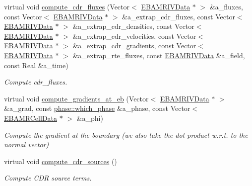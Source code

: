 \begin{DoxyCompactItemize}
virtual void \hyperlink{classtime__stepper_a860500ae7f8fb3042a5482469155a5f8}{compute\+\_\+cdr\+\_\+fluxes} (Vector$<$ \hyperlink{type__definitions_8H_a6b8fa905d55cbb491b52180386f0e0c1}{E\+B\+A\+M\+R\+I\+V\+Data} $\ast$ $>$ \&a\+\_\+fluxes, const Vector$<$ \hyperlink{type__definitions_8H_a6b8fa905d55cbb491b52180386f0e0c1}{E\+B\+A\+M\+R\+I\+V\+Data} $\ast$ $>$ \&a\+\_\+extrap\+\_\+cdr\+\_\+fluxes, const Vector$<$ \hyperlink{type__definitions_8H_a6b8fa905d55cbb491b52180386f0e0c1}{E\+B\+A\+M\+R\+I\+V\+Data} $\ast$ $>$ \&a\+\_\+extrap\+\_\+cdr\+\_\+densities, const Vector$<$ \hyperlink{type__definitions_8H_a6b8fa905d55cbb491b52180386f0e0c1}{E\+B\+A\+M\+R\+I\+V\+Data} $\ast$ $>$ \&a\+\_\+extrap\+\_\+cdr\+\_\+velocities, const Vector$<$ \hyperlink{type__definitions_8H_a6b8fa905d55cbb491b52180386f0e0c1}{E\+B\+A\+M\+R\+I\+V\+Data} $\ast$ $>$ \&a\+\_\+extrap\+\_\+cdr\+\_\+gradients, const Vector$<$ \hyperlink{type__definitions_8H_a6b8fa905d55cbb491b52180386f0e0c1}{E\+B\+A\+M\+R\+I\+V\+Data} $\ast$ $>$ \&a\+\_\+extrap\+\_\+rte\+\_\+fluxes, const \hyperlink{type__definitions_8H_a6b8fa905d55cbb491b52180386f0e0c1}{E\+B\+A\+M\+R\+I\+V\+Data} \&a\+\_\+field, const Real \&a\+\_\+time)
\begin{DoxyCompactList}\small\item\em Compute cdr\+\_\+fluxes. \end{DoxyCompactList}\item 
virtual void \hyperlink{classtime__stepper_a4f3e6ec2e018094d0f5ca4da6895b0c2}{compute\+\_\+gradients\+\_\+at\+\_\+eb} (Vector$<$ \hyperlink{type__definitions_8H_a6b8fa905d55cbb491b52180386f0e0c1}{E\+B\+A\+M\+R\+I\+V\+Data} $\ast$ $>$ \&a\+\_\+grad, const \hyperlink{namespacephase_a23c76f548a5eb1955ed8c929c541108b}{phase\+::which\+\_\+phase} \&a\+\_\+phase, const Vector$<$ \hyperlink{type__definitions_8H_a7e610f301989e5e07781c5e338bdb7c3}{E\+B\+A\+M\+R\+Cell\+Data} $\ast$ $>$ \&a\+\_\+phi)
\begin{DoxyCompactList}\small\item\em Compute the gradient at the boundary (we also take the dot product w.\+r.\+t. to the normal vector) \end{DoxyCompactList}\item 
virtual void \hyperlink{classtime__stepper_a2b13c5e1077d86409d7fb28890386d74}{compute\+\_\+cdr\+\_\+sources} ()
\begin{DoxyCompactList}\small\item\em Compute C\+DR source terms. \end{DoxyCompactList}\item 

\end{DoxyCompactItemize}

